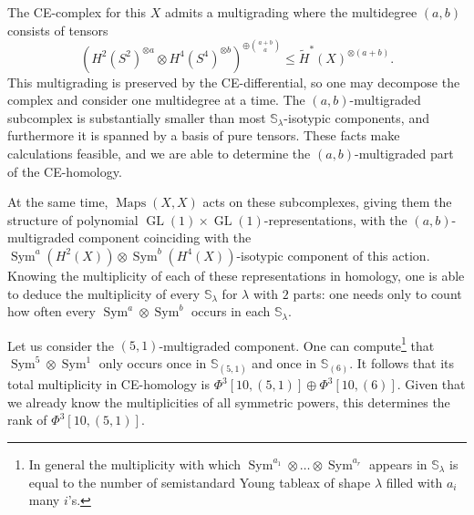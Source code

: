 \documentclass[12pt]{article}
\newcommand{\Schur}[1]{\mathbb{S}_{#1}}
\newcommand{\EndSpace}[1]{\operatorname{Maps}({#1},{#1})}
\DeclareMathOperator{\GL}{GL}
\DeclareMathOperator{\Sym}{Sym}
\theoremstyle{plain}
\theoremstyle{definition}
\theoremstyle{remark}
\begin{document}
The CE-complex for this $X$ admits a multigrading where the multidegree $(a,b)$ consists of tensors
\[
    (H^2(S^2)^{\otimes a}\otimes H^4(S^4)^{\otimes b})^{\oplus \binom{a+b}{a}} \leq \tilde{H}^*(X)^{\otimes (a+b)}.
\]
This multigrading is preserved by the CE-differential, so one may decompose the complex and consider one multidegree at a time. The $(a,b)$-multigraded subcomplex is substantially smaller than most $\Schur{\lambda}$-isotypic components, and furthermore it is spanned by a basis of pure tensors. These facts make calculations feasible, and we are able to determine the $(a,b)$-multigraded part of the CE-homology.

At the same time, $\EndSpace{X}$ acts on these subcomplexes, giving them the structure of polynomial $\GL(1)\times \GL(1)$-representations, with the $(a,b)$-multigraded component coinciding with the $\Sym^a(H^2(X))\otimes \Sym^b(H^4(X))$-isotypic component of this action. Knowing the multiplicity of each of these representations in homology, one is able to deduce the multiplicity of every $\Schur{\lambda}$ for $\lambda$ with $2$ parts: one needs only to count how often every $\Sym^a\otimes \Sym^b$ occurs in each $\Schur{\lambda}$.




Let us consider the $(5,1)$-multigraded component.
One can compute\footnote{In general the multiplicity with which $\Sym^{a_1}\otimes\ldots\otimes \Sym^{a_r}$  appears in $\Schur{\lambda}$ is equal to the number of semistandard Young tableax of shape $\lambda$ filled with $a_i$ many $i$'s.} that $\Sym^5\otimes \Sym^1$ only occurs once in $\Schur{(5,1)}$ and once in $\Schur{(6)}$. It follows that its total multiplicity in CE-homology is $\Phi^3[10,(5,1)] \oplus \Phi^3[10,(6)]$. Given that we already know the multiplicities of all symmetric powers, this determines the rank of $\Phi^3[10,(5,1)]$.
\end{document}
